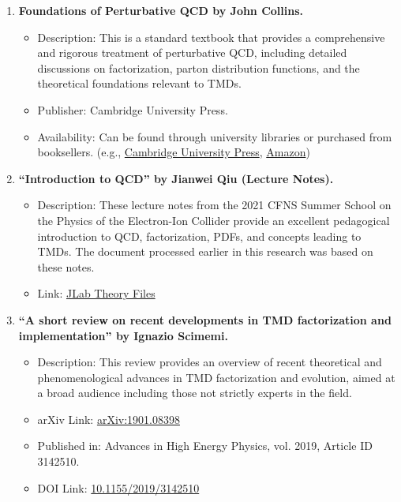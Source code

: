 \documentclass[11pt]{article}
\begin{document}
\begin{enumerate}
  \item \textbf{Foundations of Perturbative QCD by John Collins.}
        \begin{itemize}
          \item Description: This is a standard textbook that provides a comprehensive and rigorous treatment of perturbative QCD, including detailed discussions on
                factorization, parton distribution functions, and the theoretical foundations relevant to TMDs.
          \item Publisher: Cambridge University Press.
          \item Availability: Can be found through university libraries or purchased from booksellers. (e.g.,
                \href{https://www.cambridge.org/core/books/foundations-of-perturbative-qcd/F2869ED00FBD67B65EB7829879F3EDC4}{Cambridge University Press},
                \href{https://www.amazon.com/Foundations-Perturbative-Cambridge-Monographs-Cosmology/dp/1107645255}{Amazon})
        \end{itemize}

  \item \textbf{``Introduction to QCD'' by Jianwei Qiu (Lecture Notes).}
        \begin{itemize}
          \item Description: These lecture notes from the 2021 CFNS Summer School on the Physics of the Electron-Ion Collider provide an excellent pedagogical
                introduction to QCD, factorization, PDFs, and concepts leading to TMDs. The document processed earlier in this research was based on these notes.
          \item Link: \href{https://www.jlab.org/sites/default/files/theory/files/qiu21_cfns3.pdf}{JLab Theory Files}
        \end{itemize}

  \item \textbf{``A short review on recent developments in TMD factorization and implementation'' by Ignazio Scimemi.}
        \begin{itemize}
          \item Description: This review provides an overview of recent theoretical and phenomenological advances in TMD factorization and evolution, aimed at a
                broad audience including those not strictly experts in the field.
          \item arXiv Link: \href{https://arxiv.org/abs/1901.08398}{arXiv:1901.08398}
          \item Published in: Advances in High Energy Physics, vol. 2019, Article ID 3142510.
          \item DOI Link: \href{https://doi.org/10.1155/2019/3142510}{10.1155/2019/3142510}
        \end{itemize}


\end{enumerate}
\end{document}
